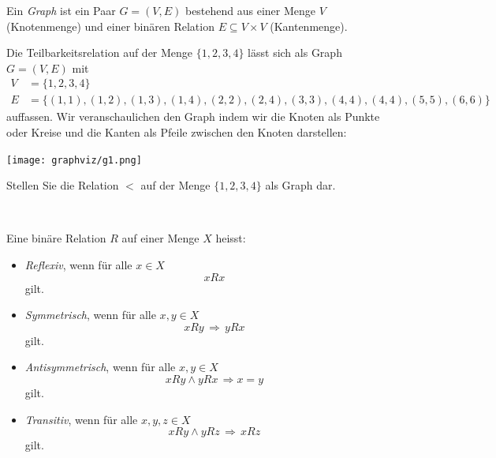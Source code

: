 \begin{df}
    Ein \textit{Graph} ist ein Paar $G=(V,E)$ bestehend aus einer Menge $V$ (Knotenmenge)
    und einer binären Relation $E\subseteq V\times V$ (Kantenmenge).
\end{df}

\begin{bsp}
    Die Teilbarkeitsrelation auf der Menge $\{1,2,3,4\}$ lässt sich als Graph
    $G=(V,E)$ mit
    \begin{align*}
    V &= \{1,2,3,4\}\\
    E &= \{(1,1),(1,2),(1,3),(1,4),(2,2),(2,4),(3,3),(4,4),
    (4,4),(5,5),(6,6)\}
    \end{align*}
    auffassen. Wir veranschaulichen den Graph indem wir die Knoten als Punkte oder Kreise
    und die Kanten als Pfeile zwischen den Knoten darstellen:

    \begin{center}
            \texttt{[image: graphviz/g1.png]}
    \end{center}


\end{bsp}

\begin{ueb}
    Stellen Sie die Relation $<$ auf der Menge $\{1,2,3,4\}$ als Graph dar.
\end{ueb}
\begin{lsg}~
    {~\answerspace{5cm}}
\end{lsg}

\begin{df}
Eine binäre Relation $R$ auf einer Menge $X$ heisst:
\begin{itemize}
\item \textit{Reflexiv}, wenn für alle $x\in X$
\[
xRx
\]
gilt.
\item \textit{Symmetrisch}, wenn für alle $x,y\in X$
\[
xRy\,\Rightarrow\, yRx
\]
gilt.
\item \textit{Antisymmetrisch}, wenn für alle $x,y\in X$
\[
xRy\land yRx\,\Rightarrow x=y
\]
gilt.
\item \textit{Transitiv}, wenn für alle $x,y,z\in X$
\[
xRy\land yRz\,\Rightarrow \, xRz
\]
gilt.
\end{itemize}
\end{df}



